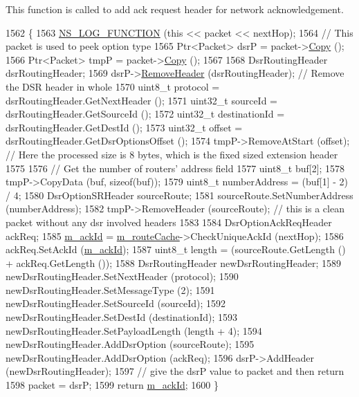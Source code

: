 This function is called to add ack request header for network acknowledgement. 


\begin{DoxyCode}
1562 \{
1563   \hyperlink{log-macros-disabled_8h_a90b90d5bad1f39cb1b64923ea94c0761}{NS\_LOG\_FUNCTION} (\textcolor{keyword}{this} << packet << nextHop);
1564   \textcolor{comment}{// This packet is used to peek option type}
1565   Ptr<Packet> dsrP = packet->\hyperlink{classns3_1_1Packet_a5d5c70802a5f77fc5f0001e0cfc1898b}{Copy} ();
1566   Ptr<Packet> tmpP = packet->\hyperlink{classns3_1_1Packet_a5d5c70802a5f77fc5f0001e0cfc1898b}{Copy} ();
1567 
1568   DsrRoutingHeader dsrRoutingHeader;
1569   dsrP->\hyperlink{classns3_1_1Packet_a0961eccf975d75f902d40956c93ba63e}{RemoveHeader} (dsrRoutingHeader);          \textcolor{comment}{// Remove the DSR header in whole}
1570   uint8\_t protocol = dsrRoutingHeader.GetNextHeader ();
1571   uint32\_t sourceId = dsrRoutingHeader.GetSourceId ();
1572   uint32\_t destinationId = dsrRoutingHeader.GetDestId ();
1573   uint32\_t offset = dsrRoutingHeader.GetDsrOptionsOffset ();
1574   tmpP->RemoveAtStart (offset);       \textcolor{comment}{// Here the processed size is 8 bytes, which is the fixed sized
       extension header}
1575 
1576   \textcolor{comment}{// Get the number of routers' address field}
1577   uint8\_t buf[2];
1578   tmpP->CopyData (buf, \textcolor{keyword}{sizeof}(buf));
1579   uint8\_t numberAddress = (buf[1] - 2) / 4;
1580   DsrOptionSRHeader sourceRoute;
1581   sourceRoute.SetNumberAddress (numberAddress);
1582   tmpP->RemoveHeader (sourceRoute);               \textcolor{comment}{// this is a clean packet without any dsr involved
       headers}
1583 
1584   DsrOptionAckReqHeader ackReq;
1585   \hyperlink{classns3_1_1dsr_1_1DsrRouting_a38c5f8c952141a9853ae9f8ee116e292}{m\_ackId} = \hyperlink{classns3_1_1dsr_1_1DsrRouting_ac409bdb961b9fff0fb63ebd026be99ad}{m\_routeCache}->CheckUniqueAckId (nextHop);
1586   ackReq.SetAckId (\hyperlink{classns3_1_1dsr_1_1DsrRouting_a38c5f8c952141a9853ae9f8ee116e292}{m\_ackId});
1587   uint8\_t length = (sourceRoute.GetLength () + ackReq.GetLength ());
1588   DsrRoutingHeader newDsrRoutingHeader;
1589   newDsrRoutingHeader.SetNextHeader (protocol);
1590   newDsrRoutingHeader.SetMessageType (2);
1591   newDsrRoutingHeader.SetSourceId (sourceId);
1592   newDsrRoutingHeader.SetDestId (destinationId);
1593   newDsrRoutingHeader.SetPayloadLength (length + 4);
1594   newDsrRoutingHeader.AddDsrOption (sourceRoute);
1595   newDsrRoutingHeader.AddDsrOption (ackReq);
1596   dsrP->AddHeader (newDsrRoutingHeader);
1597   \textcolor{comment}{// give the dsrP value to packet and then return}
1598   packet = dsrP;
1599   \textcolor{keywordflow}{return} \hyperlink{classns3_1_1dsr_1_1DsrRouting_a38c5f8c952141a9853ae9f8ee116e292}{m\_ackId};
1600 \}
\end{DoxyCode}


